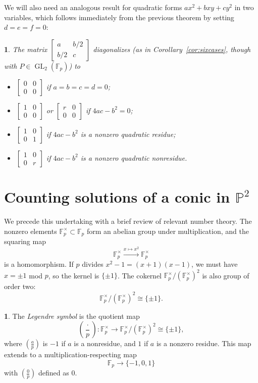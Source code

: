 \documentclass[10pt,a4paper]{amsart}
\numberwithin{equation}{section}
\numberwithin{figure}{section}
\theoremstyle{definition}
\theoremstyle{remark}
\theoremstyle{plain}
\theoremstyle{plain}
\newtheorem{cor}{\protect\corollaryname}[section]
\theoremstyle{definition}
\newtheorem{defn}{\protect\definitionname}[section]
\theoremstyle{plain}
\theoremstyle{plain}
\providecommand{\definitionname}{Definition}
\providecommand{\corollaryname}{Corollary}
\newcommand{\legendre}[2]{\genfrac{(}{)}{}{}{#1}{#2}}
\renewcommand{\P}{\mathbb{P}}
\newcommand{\F}{\mathbb{F}}
\newcommand{\GL}{\operatorname{GL}}
\begin{document}
	We will also need an analogous result for quadratic forms $ax^2+bxy+cy^2$ in two variables, which follows immediately from the previous theorem by setting $d=e=f=0$:
	\begin{cor}\label{cor:diag-P1}
	The matrix $\left[\begin{smallmatrix}a&b/2\\b/2&c\end{smallmatrix}\right]$ diagonalizes (as in Corollary~\ref{cor:sixcases}, though with $P \in \GL_2(\F_p)$) to
	\begin{itemize}
	\item $\left[\begin{smallmatrix}0&0\\0&0\end{smallmatrix}\right]$ if $a=b=c=d=0$;
	\item $\left[\begin{smallmatrix}1&0\\0&0\end{smallmatrix}\right]$ or $\left[\begin{smallmatrix}r&0\\0&0\end{smallmatrix}\right]$ if $4ac-b^2=0$;
	\item $\left[\begin{smallmatrix}1&0\\0&1\end{smallmatrix}\right]$ if $4ac-b^2$ is a nonzero quadratic residue;
	\item $\left[\begin{smallmatrix}1&0\\0&r\end{smallmatrix}\right]$ if $4ac-b^2$ is a nonzero quadratic nonresidue.
	\end{itemize}
	\end{cor}

    \section{Counting solutions of a conic in $\P^2$}\label{sec:proj-solutions}

	We precede this undertaking with a brief review of relevant number theory.
	The nonzero elements $\F_p^\times \subset \F_p$ form an abelian
	group under multiplication, and the squaring map 
	\[ \F^\times_p \xrightarrow{x \mapsto x^2} \F^\times_p \] 
	is a homomorphism. If $p$ divides $x^2 - 1 = (x+1)(x-1)$, we must have 
	$x = \pm 1$ mod $p$, so the kernel is $\{\pm 1\}$. 
	The cokernel $\F_p^\times / (\F_p^\times)^2$ is also group of order two: 
	\[ \F_p^\times / (\F_p^\times)^2 \cong \{\pm 1\}.  \]
	\begin{defn}
		The \emph{Legendre symbol} is the quotient map    
		\[ \legendre{\cdot}{p}: 
		\F_p^\times \to \F_p^\times / (\F_p^\times)^2 \cong \{\pm 1\}, \]
		where $\legendre{a}{p}$ is $-1$ if $a$ is a nonresidue,
		and $1$ if $a$ is a nonzero residue. This map extends to a multiplication-respecting map
		\[ \F_p \to \{-1,0,1\} \]
		with $\legendre{0}{p}$ defined as $0$.
	\end{defn}
	
\end{document}
